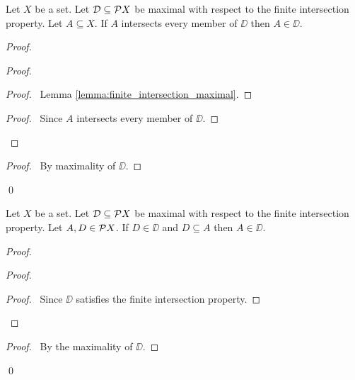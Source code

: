 \begin{lemma}
    \label{lemma:member_maximal_finite_intersection}
    Let $X$ be a set. Let $\mathcal{D} \subseteq \mathcal{P} X$ be maximal with respect to the finite intersection property.
    Let $A \subseteq X$. If $A$ intersects every member of $\DD$ then $A \in \DD$.
\end{lemma}

\begin{proof}
    \pf
    \begin{proof}
        \begin{proof}
            \pf\ Lemma \ref{lemma:finite_intersection_maximal}.
        \end{proof}
        \begin{proof}
            \pf\ Since $A$ intersects every member of $\DD$.
        \end{proof}
    \end{proof}
    \qedstep
    \begin{proof}
        \pf\ By maximality of $\DD$.
    \end{proof}
    \qed
\end{proof}

\begin{proposition}
    Let $X$ be a set. Let $\mathcal{D} \subseteq \mathcal{P} X$ be maximal with respect to the
    finite intersection property. Let $A, D \in \mathcal{P} X$.
    If $D \in \DD$ and $D \subseteq A$ then $A \in \DD$.
\end{proposition}

\begin{proof}
    \pf
    \begin{proof}
        \begin{proof}
            \pf\ Since $\DD$ satisfies the finite intersection property.
        \end{proof}
    \end{proof}
    \begin{proof}
        \pf\ By the maximality of $\DD$.
    \end{proof}
    \qed
\end{proof}

